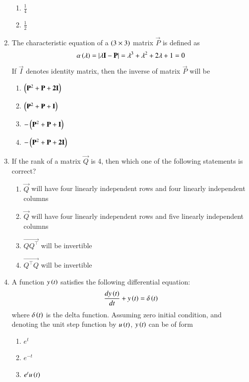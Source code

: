 \documentclass[journal]{IEEEtran}
\begin{document}
\begin{enumerate}
\begin{enumerate}
     \item $\frac{1}{4}$
     \item $\frac{1}{2}$ \\
 \end{enumerate}
\item The characteristic equation of a $\left(3 \times 3\right)$ matrix $\vec{P}$ is defined as 
\begin{align*}
    \alpha\left(\lambda\right) = \left\vert\lambda\mathbf{I} - \mathbf{P}\right\vert = \lambda^3 + \lambda^2 + 2\lambda + 1 = 0
\end{align*}
If $\vec{I}$ denotes identity matrix, then the inverse of matrix $\vec{P}$ will be
\begin{enumerate}
    \item $\left(\mathbf{P}^2 + \mathbf{P} + \mathbf{2I}\right)$
    \item $\left(\mathbf{P}^2 + \mathbf{P} + \mathbf{I}\right)$
    \item $-\left(\mathbf{P}^2 + \mathbf{P} + \mathbf{I}\right)$
    \item $-\left(\mathbf{P}^2 + \mathbf{P} + \mathbf{2I}\right)$ \\
\end{enumerate}
\item If the rank of a  matrix $\vec{Q}$ is 4, then which one of the following statements is correct?
\begin{enumerate}
    \item $\vec{Q}$ will have four linearly independent rows and four linearly independent columns
    \item $\vec{Q}$ will have four linearly independent rows and five linearly independent columns
    \item $\vec{Q Q^\intercal}$ will be invertible
    \item $\vec{Q^\intercal Q}$ will be invertible \\
\end{enumerate}
\item A function $y\left(t\right)$ satisfies the following differential equation:
\begin{align*}
    \frac{dy\left(t\right)}{dt} + y\left(t\right) = \delta\left(t\right)
\end{align*}
where $\delta\left(t\right)$ is the delta function. Assuming zero initial condition, and denoting the unit step function by $u\left(t\right)$, $y\left(t\right)$ can be of form
\begin{enumerate}
    \item $e^t$
    \item $e^{-t}$
    \item $e^tu\left(t\right)$

\end{enumerate}
\end{enumerate}
\end{document}
